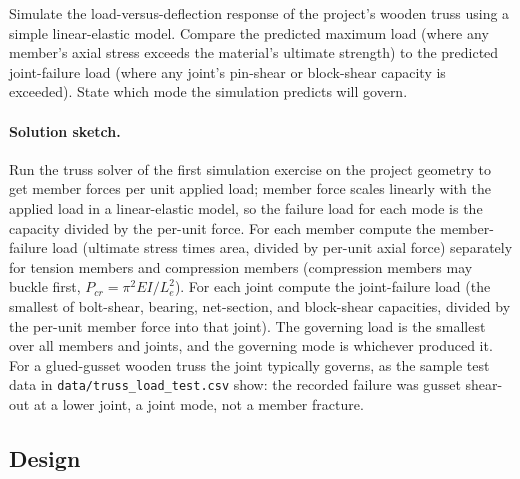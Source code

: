 \begin{exercise}
Simulate the load-versus-deflection response of the project's
wooden truss using a simple linear-elastic model. Compare the
predicted maximum load (where any member's axial stress exceeds the
material's ultimate strength) to the predicted joint-failure load
(where any joint's pin-shear or block-shear capacity is exceeded).
State which mode the simulation predicts will govern.

\paragraph{Solution sketch.} Run the truss solver of the first
simulation exercise on the project geometry to get member forces per
unit applied load; member force scales linearly with the applied load in
a linear-elastic model, so the failure load for each mode is the
capacity divided by the per-unit force. For each member compute the
member-failure load (ultimate stress times area, divided by per-unit
axial force) separately for tension members and compression members
(compression members may buckle first, $P_{cr} = \pi^2 EI/L_e^2$). For
each joint compute the joint-failure load (the smallest of bolt-shear,
bearing, net-section, and block-shear capacities, divided by the
per-unit member force into that joint). The governing load is the
smallest over all members and joints, and the governing mode is whichever
produced it. For a glued-gusset wooden truss the joint typically governs,
as the sample test data in \texttt{data/truss\_load\_test.csv} show: the
recorded failure was gusset shear-out at a lower joint, a joint mode, not
a member fracture.
\end{exercise}

\subsection*{Design}


